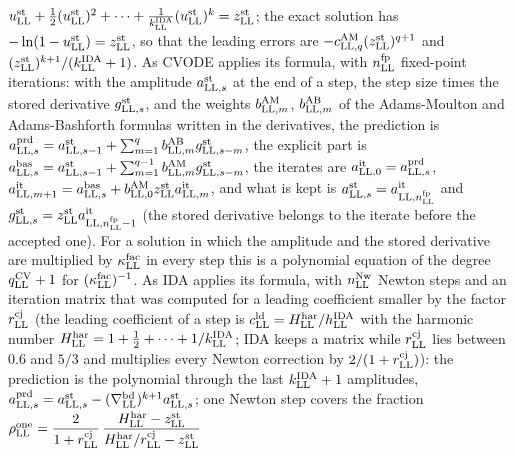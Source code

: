 \documentclass[
  10pt,
]{article}
\begin{document}
\begin{itemize}
  \(u^{\rm st}_{\rm LL}+\tfrac12(u^{\rm st}_{\rm LL})^2+\dots+\tfrac{1}{k^{\rm IDA}_{\rm LL}}(u^{\rm st}_{\rm LL})^{k}=z^{\rm st}_{\rm LL}\);
  the exact solution has
  \(-\ln(1-u^{\rm st}_{\rm LL})=z^{\rm st}_{\rm LL}\), so that the
  leading errors are
  \(-c^{\rm AM}_{{\rm LL},q}(z^{\rm st}_{\rm LL})^{q+1}\) and
  \((z^{\rm st}_{\rm LL})^{k+1}/(k^{\rm IDA}_{\rm LL}+1)\). As CVODE
  applies its formula, with \(n^{\rm fp}_{\rm LL}\) fixed-point
  iterations: with the amplitude \(a^{\rm st}_{{\rm LL},s}\) at the end
  of a step, the step size times the stored derivative
  \(g^{\rm st}_{{\rm LL},s}\), and the weights
  \(b^{\rm AM}_{{\rm LL},m}\), \(b^{\rm AB}_{{\rm LL},m}\) of the
  Adams-Moulton and Adams-Bashforth formulas written in the derivatives,
  the prediction is
  \(a^{\rm prd}_{{\rm LL},s}=a^{\rm st}_{{\rm LL},s-1}+\sum_{m=1}^{q}b^{\rm AB}_{{\rm LL},m}g^{\rm st}_{{\rm LL},s-m}\),
  the explicit part is
  \(a^{\rm bas}_{{\rm LL},s}=a^{\rm st}_{{\rm LL},s-1}+\sum_{m=1}^{q-1}b^{\rm AM}_{{\rm LL},m}g^{\rm st}_{{\rm LL},s-m}\),
  the iterates are \(a^{\rm it}_{{\rm LL},0}=a^{\rm prd}_{{\rm LL},s}\),
  \(a^{\rm it}_{{\rm LL},m+1}=a^{\rm bas}_{{\rm LL},s}+b^{\rm AM}_{{\rm LL},0}z^{\rm st}_{\rm LL}a^{\rm it}_{{\rm LL},m}\),
  and what is kept is
  \(a^{\rm st}_{{\rm LL},s}=a^{\rm it}_{{\rm LL},n^{\rm fp}_{\rm LL}}\)
  and
  \(g^{\rm st}_{{\rm LL},s}=z^{\rm st}_{\rm LL}a^{\rm it}_{{\rm LL},n^{\rm fp}_{\rm LL}-1}\)
  (the stored derivative belongs to the iterate before the accepted
  one). For a solution in which the amplitude and the stored derivative
  are multiplied by \(\kappa^{\rm fac}_{\rm LL}\) in every step this is
  a polynomial equation of the degree \(q^{\rm CV}_{\rm LL}+1\) for
  \((\kappa^{\rm fac}_{\rm LL})^{-1}\). As IDA applies its formula, with
  \(n^{\rm Nw}_{\rm LL}\) Newton steps and an iteration matrix that was
  computed for a leading coefficient smaller by the factor
  \(r^{\rm cj}_{\rm LL}\) (the leading coefficient of a step is
  \(c^{\rm ld}_{\rm LL}=H^{\rm har}_{\rm LL}/h^{\rm IDA}_{\rm LL}\) with
  the harmonic number
  \(H^{\rm har}_{\rm LL}=1+\tfrac12+\dots+1/k^{\rm IDA}_{\rm LL}\); IDA
  keeps a matrix while \(r^{\rm cj}_{\rm LL}\) lies between 0.6 and
  \(5/3\) and multiplies every Newton correction by
  \(2/(1+r^{\rm cj}_{\rm LL})\)): the prediction is the polynomial
  through the last \(k^{\rm IDA}_{\rm LL}+1\) amplitudes,
  \(a^{\rm prd}_{{\rm LL},s}=a^{\rm st}_{{\rm LL},s}-(\nabla^{\rm bd}_{\rm LL})^{k+1}a^{\rm st}_{{\rm LL},s}\);
  one Newton step covers the fraction
  \(\rho^{\rm one}_{\rm LL}=\dfrac{2}{1+r^{\rm cj}_{\rm LL}}\,\dfrac{H^{\rm har}_{\rm LL}-z^{\rm st}_{\rm LL}}{H^{\rm har}_{\rm LL}/r^{\rm cj}_{\rm LL}-z^{\rm st}_{\rm LL}}\)

\end{itemize}
\end{document}
